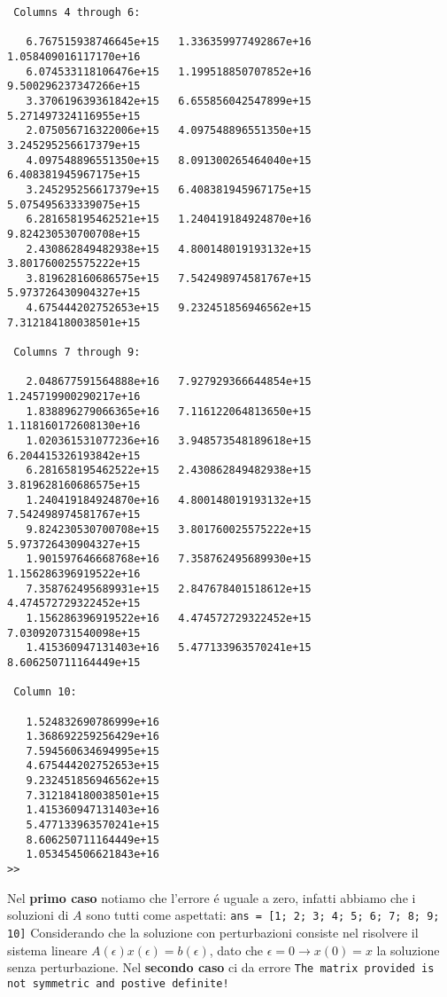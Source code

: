 \begin{lstlisting}
 Columns 4 through 6:

   6.767515938746645e+15   1.336359977492867e+16   1.058409016117170e+16
   6.074533118106476e+15   1.199518850707852e+16   9.500296237347266e+15
   3.370619639361842e+15   6.655856042547899e+15   5.271497324116955e+15
   2.075056716322006e+15   4.097548896551350e+15   3.245295256617379e+15
   4.097548896551350e+15   8.091300265464040e+15   6.408381945967175e+15
   3.245295256617379e+15   6.408381945967175e+15   5.075495633339075e+15
   6.281658195462521e+15   1.240419184924870e+16   9.824230530700708e+15
   2.430862849482938e+15   4.800148019193132e+15   3.801760025575222e+15
   3.819628160686575e+15   7.542498974581767e+15   5.973726430904327e+15
   4.675444202752653e+15   9.232451856946562e+15   7.312184180038501e+15

 Columns 7 through 9:

   2.048677591564888e+16   7.927929366644854e+15   1.245719900290217e+16
   1.838896279066365e+16   7.116122064813650e+15   1.118160172608130e+16
   1.020361531077236e+16   3.948573548189618e+15   6.204415326193842e+15
   6.281658195462522e+15   2.430862849482938e+15   3.819628160686575e+15
   1.240419184924870e+16   4.800148019193132e+15   7.542498974581767e+15
   9.824230530700708e+15   3.801760025575222e+15   5.973726430904327e+15
   1.901597646668768e+16   7.358762495689930e+15   1.156286396919522e+16
   7.358762495689931e+15   2.847678401518612e+15   4.474572729322452e+15
   1.156286396919522e+16   4.474572729322452e+15   7.030920731540098e+15
   1.415360947131403e+16   5.477133963570241e+15   8.606250711164449e+15

 Column 10:

   1.524832690786999e+16
   1.368692259256429e+16
   7.594560634694995e+15
   4.675444202752653e+15
   9.232451856946562e+15
   7.312184180038501e+15
   1.415360947131403e+16
   5.477133963570241e+15
   8.606250711164449e+15
   1.053454506621843e+16
>>
\end{lstlisting}
Nel \textbf{primo caso} notiamo che l'errore é uguale a zero, infatti abbiamo che i soluzioni di $A$
sono tutti come aspettati: \lstinline{ans = [1; 2; 3; 4; 5; 6; 7; 8; 9; 10]}
\newline
Considerando che la soluzione con perturbazioni consiste nel risolvere il sistema
lineare $A(\epsilon)x(\epsilon) = b(\epsilon)$, dato che $\epsilon = 0 \rightarrow x(0) = x$
la soluzione senza perturbazione.
\newline
\newline
Nel \textbf{secondo caso} ci da errore \lstinline{The matrix provided is not symmetric and postive definite!}

